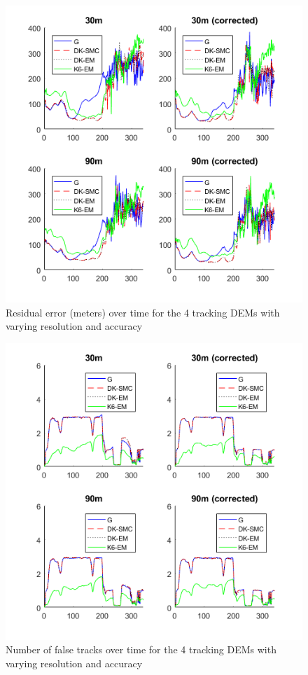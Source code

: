 \documentclass[journal]{IEEEtran}
\begin{document}
\begin{figure}[ht]
    \centering
    \includegraphics[scale=0.7]{combined_rmse_5000mc.png}
    \caption{Residual error (meters) over time for the 4 tracking DEMs with varying resolution and accuracy}
    \label{fig:combined_rmse_plots}
\end{figure}

\begin{figure}[ht]
    \centering
    \includegraphics[scale=0.7]{combined_nft_5000mc.png}
    \caption{Number of false tracks over time for the 4 tracking DEMs with varying resolution and accuracy}
    \label{fig:combined_nft_plots}
\end{figure}
\end{document}
